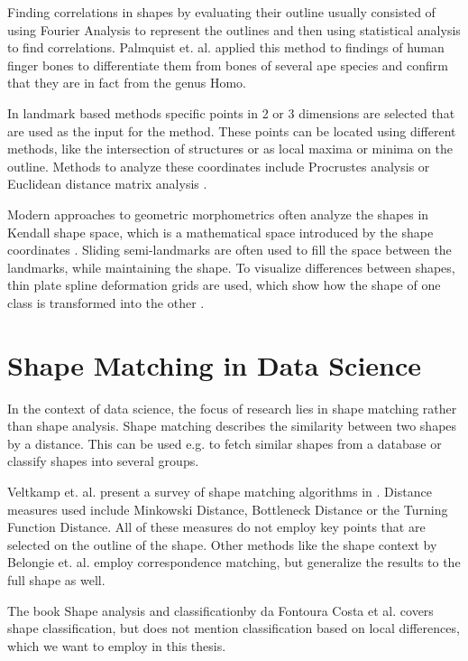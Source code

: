 \documentclass[pdftex,12pt,a4paper]{report}
\begin{document}
Finding correlations in shapes by evaluating their outline usually consisted of using Fourier Analysis to represent the outlines and then using statistical analysis to find correlations. Palmquist et. al. \cite{palmqvist1996comparative} applied this method to findings of human finger bones to differentiate them from bones of several ape species and confirm that they are in fact from the genus Homo. 

In landmark based methods specific points in 2 or 3 dimensions are selected that are used as the input for the method. These points can be located using different methods, like the intersection of structures or as local maxima or minima on the outline. Methods to analyze these coordinates include Procrustes analysis \cite{small1996statistical} or Euclidean distance matrix analysis \cite{lele1991euclidean}.

Modern approaches to geometric morphometrics often analyze the shapes in Kendall shape space, which is a mathematical space introduced by the shape coordinates \cite{mitteroecker2009advances}. Sliding semi-landmarks are often used to fill the space between the landmarks, while maintaining the shape. To visualize differences between shapes, thin plate spline deformation grids are used, which show how the shape of one class is transformed into the other \cite{adams2004geometric}.

\section{Shape Matching in Data Science}

In the context of data science, the focus of research lies in shape matching rather than shape analysis. Shape matching describes the similarity between two shapes by a distance. This can be used e.g. to fetch similar shapes from a database or classify shapes into several groups.

Veltkamp et. al. present a survey of shape matching algorithms in \cite{veltkamp2001shape}. Distance measures used include Minkowski Distance, Bottleneck Distance or the Turning Function Distance. All of these measures do not employ key points that are selected on the outline of the shape. Other methods like the shape context by Belongie et. al. \cite{belongie2002shape} employ correspondence matching, but generalize the results to the full shape as well.

The book \grqq Shape analysis and classification\grqq  by da Fontoura Costa et al. \cite{da2010shape} covers shape classification, but does not mention classification based on local differences, which we want to employ in this thesis.
\end{document}
